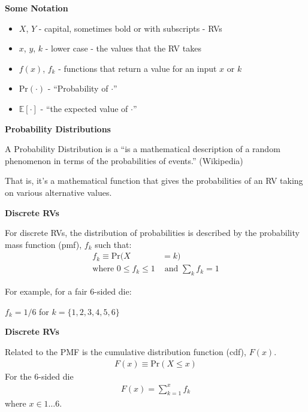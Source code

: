 \documentclass[12pt,xcolor=svgnames]{beamer}
\newcommand{\bl}{\color{blue}}
\newcommand{\theme}{\color{FireBrick}}
\newcommand{\ds}[1]{\mathds{#1}}
\newcommand{\sk}{\vspace{.4cm}}
\newcommand{\nsk}{\vspace{-.4cm}}
\newcommand{\chap}[1]{{\theme \Large \bf #1} \sk}
\newcommand{\E}{\ds{E}}
\newcommand{\pr}{\text{Pr}}
\begin{document}
\begin{frame}
\chap{Some Notation}

\begin{itemize}
\item $X$, $Y$ - capital, sometimes bold or with subscripts - RVs
\item $x$, $y$, $k$ - lower case - the values that the RV takes
\item $f(x)$, $f_k$ - functions that return a value for an input $x$ or $k$
\item $\pr(\cdot)$ - ``Probability of $\cdot$''
\item $\E[\cdot]$ - ``the expected value of $\cdot$''
\end{itemize}

\end{frame}


\begin{frame}
\chap{Probability Distributions}

A {\bl Probability Distribution} is a ``is a mathematical description of a random phenomenon in terms of the probabilities of events.'' (Wikipedia)

\sk
That is, it's a mathematical function that gives the probabilities of an RV taking on various alternative values. 

\end{frame}



\begin{frame}
\chap{Discrete RVs}

For discrete RVs, the distribution of probabilities is described by the {\bl probability mass function} (pmf), $f_k$ such that:
\begin{align*}
f_k  \equiv \pr(X & = k) \\
\text{where } 0\leq f_k \leq 1 & \text{ and } \sum_k f_k = 1
\end{align*}
\nsk

For example, for a fair 6-sided die:

$f_k = 1/6$ for $k= \{1,2,3,4,5,6\}$

\end{frame}

\begin{frame}
\chap{Discrete RVs}

Related to the PMF is the {\bl cumulative distribution function} (cdf), $F(x)$. 
\begin{align*}
F(x) \equiv \pr(X \leq x)
\end{align*}
For the 6-sided die
\nsk
\begin{align*}
F(x)= \sum_{k=1}^x f_k
\end{align*}
where $x \in 1\dots 6$.  \\

\end{frame}
\end{document}
